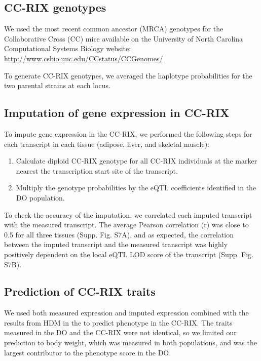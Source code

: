\documentclass[
]{article}
\providecommand{\tightlist}{%
  \setlength{\itemsep}{0pt}\setlength{\parskip}{0pt}}
\begin{document}
\subsection{CC-RIX genotypes}\label{cc-rix-genotypes}

We used the most recent common ancestor (MRCA) genotypes for the
Collaborative Cross (CC) mice available on the University of North
Carolina Computational Systems Biology website:
\url{http://www.csbio.unc.edu/CCstatus/CCGenomes/}

To generate CC-RIX genotypes, we averaged the haplotype probabilities
for the two parental strains at each locus.

\subsection{Imputation of gene expression in
CC-RIX}\label{imputation-of-gene-expression-in-cc-rix}

To impute gene expression in the CC-RIX, we performed the following
steps for each transcript in each tissue (adipose, liver, and skeletal
muscle):

\begin{enumerate}
\def\labelenumi{\arabic{enumi}.}
\tightlist
\item
  Calculate diploid CC-RIX genotype for all CC-RIX individuals at the
  marker nearest the transcription start site of the transcript.
\item
  Multiply the genotype probabilities by the eQTL coefficients
  identified in the DO population.
\end{enumerate}

To check the accuracy of the imputation, we correlated each imputed
transcript with the measured transcript. The average Pearson correlation
(r) was close to 0.5 for all three tissues (Supp. Fig. S7A), and as
expected, the correlation between the imputed transcript and the
measured transcript was highly positively dependent on the local eQTL
LOD score of the transcript (Supp. Fig. S7B).

\subsection{Prediction of CC-RIX
traits}\label{prediction-of-cc-rix-traits}

We used both measured expression and imputed expression combined with
the results from HDM in the to predict phenotype in the CC-RIX. The
traits measured in the DO and the CC-RIX were not identical, so we
limited our prediction to body weight, which was measured in both
populations, and was the largest contributor to the phenotype score in
the DO.
\end{document}

